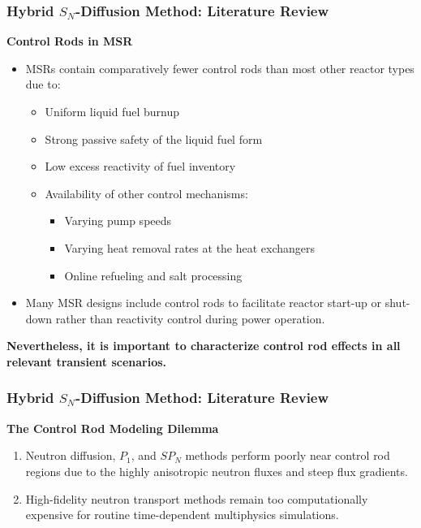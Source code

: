 \begin{frame}
  \frametitle{Hybrid $S_N$-Diffusion Method: Literature Review}
  \textbf{Control Rods in MSR}
  \begin{itemize}
    \item MSRs contain comparatively fewer control rods than most other reactor types due to:
      \begin{itemize}
        \item Uniform liquid fuel burnup
        \item Strong passive safety of the liquid fuel form
        \item Low excess reactivity of fuel inventory
        \item Availability of other control mechanisms:
        \begin{itemize}
          \item Varying pump speeds
          \item Varying heat removal rates at the heat exchangers
          \item Online refueling and salt processing
        \end{itemize}
      \end{itemize}
    \item Many MSR designs include control rods to facilitate reactor start-up or shut-down rather
      than reactivity control during power operation.
  \end{itemize}
  \pause
  \textbf{Nevertheless, it is important to characterize control rod effects in all relevant
  transient scenarios.}
\end{frame}

\begin{frame}
  \frametitle{Hybrid $S_N$-Diffusion Method: Literature Review}
  \textbf{The Control Rod Modeling Dilemma}
  \begin{enumerate}
    \item Neutron diffusion, $P_1$, and $SP_N$ methods perform poorly near control rod regions
      due to the highly anisotropic neutron fluxes and steep flux gradients.
    \item High-fidelity neutron transport methods remain too computationally expensive for routine
      time-dependent multiphysics simulations.
  \end{enumerate}
\end{frame}

